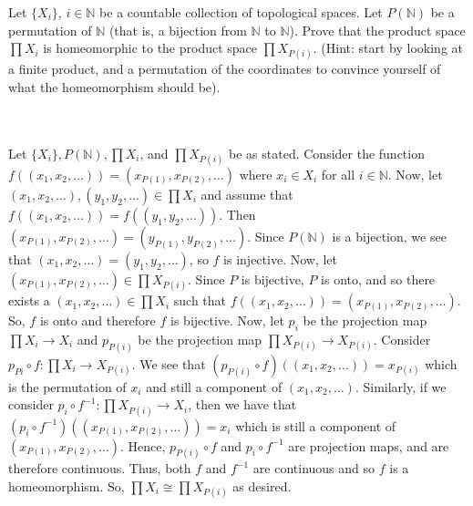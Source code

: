 Let $\{X_i\}$, $i\in \mathbb{N}$ be a countable collection of topological spaces. Let $P(\mathbb{N})$
be a permutation of $\mathbb{N}$ (that is, a bijection from $\mathbb{N}$ to $\mathbb{N}$). Prove that
the product space $\prod X_i$ is homeomorphic to the product space $\prod X_{P(i)}$.
(Hint: start by looking at a finite product, and a permutation of the coordinates to convince
yourself of what the homeomorphism should be).\\\\


\begin{solution}\renewcommand{\qedsymbol}{}\ \\
    Let $\{X_i\}, P(\mathbb{N}), \prod X_i$, and $\prod X_{P(i)}$ be as stated. Consider the function
    $f((x_1, x_2,\ldots))=(x_{P(1)}, x_{P(2)},\dots)$ where $x_i\in X_i$ for all $i\in\mathbb{N}$. Now,
    let $(x_1, x_2,\ldots), (y_1, y_2,\ldots)\in\prod X_i$ and assume that
    $f((x_1, x_2,\ldots))=f( (y_1, y_2,\ldots))$. Then
    $(x_{P(1)}, x_{P(2)},\ldots)=(y_{P(1)}, y_{P(2)},\ldots)$. Since $P(\mathbb{N})$ is a bijection, we
    see that $(x_1, x_2,\ldots)=(y_1, y_2,\ldots)$, so $f$ is injective. Now, let
    $(x_{P(1)}, x_{P(2)},\ldots)\in\prod X_{P(i)}$. Since $P$ is bijective, $P$ is onto, and so there
    exists a $(x_1, x_2,\ldots)\in\prod X_i$ such that
    $f((x_1, x_2,\ldots))=(x_{P(1)}, x_{P(2)},\ldots)$. So, $f$ is onto and therefore $f$ is bijective.
    Now, let $p_i$ be the projection map $\prod X_{i}\rightarrow X_{i}$ and $p_{P(i)}$ be the projection
    map $\prod X_{P(i)}\rightarrow X_{P(i)}$. Consider $p_{P{i}}\circ f:\prod X_i\rightarrow X_{P(i)}$.
    We see that $(p_{P(i)}\circ f)((x_1, x_2,\ldots))=x_{P(i)}$ which is the permutation of $x_i$ and
    still a component of $(x_1, x_2,\ldots)$. Similarly, if we consider
    $p_i\circ f^{-1}:\prod X_{P(i)}\rightarrow X_i$, then we have that
    $(p_i\circ f^{-1})((x_{P(1)}, x_{P(2)},\ldots))=x_i$ which is still a component of
    $(x_{P(1)}, x_{P(2)},\ldots)$. Hence, $p_{P(i)}\circ f$ and $p_i\circ f^{-1}$ are projection maps,
    and are therefore continuous. Thus, both $f$ and $f^{-1}$ are continuous and so $f$ is a
    homeomorphism. So, $\prod X_i\cong \prod X_{P(i)}$ as desired.

\end{solution}